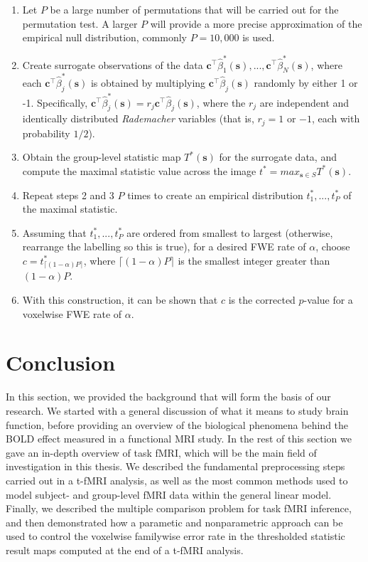 \begin{enumerate}
	\item Let $P$ be a large number of permutations that will be carried out for the permutation test. A larger $P$ will provide a more precise approximation of the empirical null distribution, commonly $P = 10,000$ is used.  
	\item Create surrogate observations of the data $\bm{c}^{\intercal}\hat{\beta}^{*}_{1}(\bm{s}), ..., \bm{c}^{\intercal}\hat{\beta}^{*}_{N}(\bm{s})$, where each $\bm{c}^{\intercal}\hat{\beta}^{*}_{j}(\bm{s})$ is obtained by multiplying $\bm{c}^{\intercal}\hat{\beta}_{j}(\bm{s})$ randomly by either 1 or -1. Specifically, $\bm{c}^{\intercal}\hat{\beta}^{*}_{j}(\bm{s}) = r_j \bm{c}^{\intercal}\hat{\beta}_{j}(\bm{s})$, where the $r_j$ are independent and identically distributed \textit{Rademacher} variables (that is, $r_j = 1$ or $-1$, each with probability $1/2$).
	\item Obtain the group-level statistic map $T^{*}(\bm{s})$ for the surrogate data, and compute the maximal statistic value across the image $t^{*} = max_{\bm{s} \in S} T^{*}(\bm{s})$. 
	\item Repeat steps 2 and 3 $P$ times to create an empirical distribution $t^{*}_{1}, ..., t^{*}_{P}$ of the maximal statistic. 
	\item Assuming that $t^{*}_{1}, ..., t^{*}_{P}$ are ordered from smallest to largest (otherwise, rearrange the labelling so this is true), for a desired FWE rate of $\alpha$, choose $c = t^{*}_{\lceil (1 -\alpha) P \rceil}$, where $\lceil (1 -\alpha) P \rceil$ is the smallest integer greater than $(1 -\alpha) P$.
	\item With this construction, it can be shown that $c$ is the corrected $p$-value for a voxelwise FWE rate of $\alpha$.
\end{enumerate}

\pagebreak

\section{Conclusion}
In this section, we provided the background that will form the basis of our research. We started with a general discussion of what it means to study brain function, before providing an overview of the biological phenomena behind the BOLD effect measured in a functional MRI study.  In the rest of this section we gave an in-depth overview of task fMRI, which will be the main field of investigation in this thesis. We described the fundamental preprocessing steps carried out in a t-fMRI analysis, as well as the most common methods used to model subject- and group-level fMRI data within the general linear model. Finally, we described the multiple comparison problem for task fMRI inference, and then demonstrated how a parametic and nonparametric approach can be used to control the voxelwise familywise error rate in the thresholded statistic result maps computed at the end of a t-fMRI analysis. 